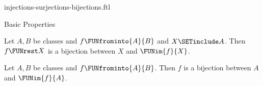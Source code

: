 \documentclass{naproche-library}
\begin{document}
\begin{smodule}[title={Injective, Surjective and Bijective Maps}]{injections-surjections-bijections.ftl}
\begin{sfragment}{Basic Properties}
  \begin{proposition}[forthel,id=FOUNDATIONS_08_647446231252992]
    Let $A, B$ be classes and $f \FUNfrominto{A}{B}$ and $X \SETinclude A$.
    Then $f \FUNrest X$ is a bijection between $X$ and $\FUNim{f}{X}$.
  \end{proposition}

  \begin{corollary}[forthel,id=FOUNDATIONS_08_8159443759923200]
    Let $A, B$ be classes and $f \FUNfrominto{A}{B}$.
    Then $f$ is a bijection between $A$ and $\FUNim{f}{A}$.
  \end{corollary}
\end{sfragment}
\end{smodule}
\end{document}
